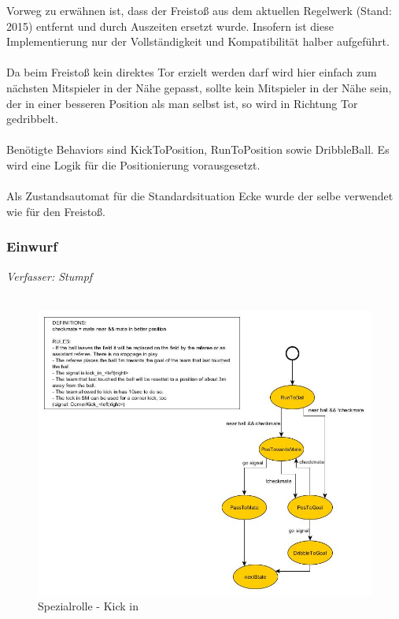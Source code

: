 \documentclass[fontsize=12pt,a4paper,final]{scrartcl}[2003/01/01]
\begin{document}
Vorweg zu erwähnen ist, dass der Freisto{\ss} aus dem aktuellen Regelwerk (Stand: 2015) entfernt und durch Auszeiten ersetzt wurde. Insofern ist diese Implementierung nur der Vollständigkeit und Kompatibilität halber aufgeführt.\\
\\
Da beim Freisto{\ss} kein direktes Tor erzielt werden darf wird hier einfach zum nächsten Mitspieler in der Nähe gepasst, sollte kein Mitspieler in der Nähe sein, der in einer besseren Position als man selbst ist, so wird in Richtung Tor gedribbelt.\\
\\
Benötigte Behaviors sind KickToPosition, RunToPosition sowie DribbleBall. Es wird eine Logik für die Positionierung vorausgesetzt.\\
\\
Als Zustandsautomat für die Standardsituation Ecke wurde der selbe verwendet wie für den Freisto{\ss}.

\subsubsection{Einwurf}
\textit{Verfasser: Stumpf}\\
\\
\begin{figure}[H]
	\centering
	\includegraphics[width=\textwidth]{Grafiken/KI/Standardsituationen/KickInSM}
	\caption{Spezialrolle - Kick in}
	\label{fig:Standard - KickIn}
\end{figure}
\end{document}
